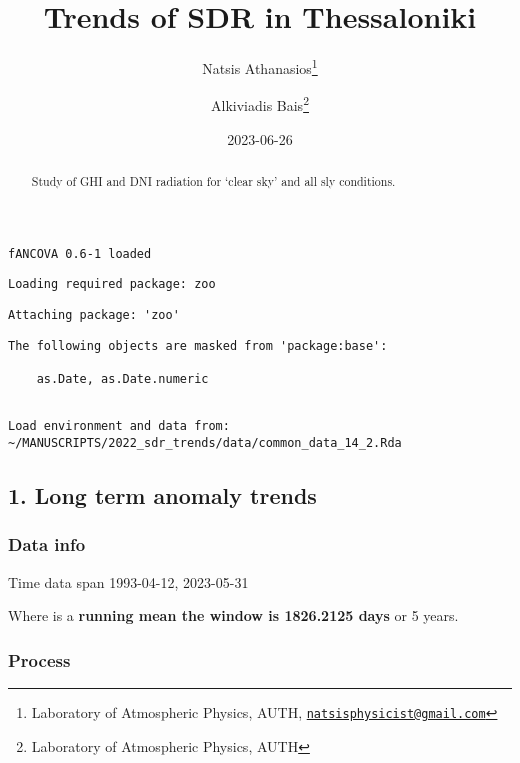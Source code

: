 \documentclass[
  10pt,
  a4paper,oneside]{article}
\title{Trends of SDR in Thessaloniki}
\author{Natsis Athanasios\footnote{Laboratory of Atmospheric Physics, AUTH, \href{mailto:natsisphysicist@gmail.com}{\nolinkurl{natsisphysicist@gmail.com}}} \and Alkiviadis Bais\footnote{Laboratory of Atmospheric Physics, AUTH}}
\date{2023-06-26}
\begin{document}
\maketitle
\begin{abstract}
Study of GHI and DNI radiation for `clear sky' and all sly conditions.
\end{abstract}

{
\hypersetup{linkcolor=}
\setcounter{tocdepth}{4}
\tableofcontents
}
\begin{verbatim}
fANCOVA 0.6-1 loaded
\end{verbatim}

\begin{verbatim}
Loading required package: zoo
\end{verbatim}

\begin{verbatim}
Attaching package: 'zoo'
\end{verbatim}

\begin{verbatim}
The following objects are masked from 'package:base':

    as.Date, as.Date.numeric
\end{verbatim}

\begin{verbatim}

Load environment and data from:  ~/MANUSCRIPTS/2022_sdr_trends/data/common_data_14_2.Rda 
\end{verbatim}

\hypertarget{long-term-anomaly-trends}{%
\subsection{1. Long term anomaly trends}\label{long-term-anomaly-trends}}

\hypertarget{data-info}{%
\subsubsection{Data info}\label{data-info}}

Time data span 1993-04-12, 2023-05-31

Where is a \textbf{running mean the window is 1826.2125 days} or
5 years.

\hypertarget{process}{%
\subsubsection{Process}\label{process}}
\end{document}
